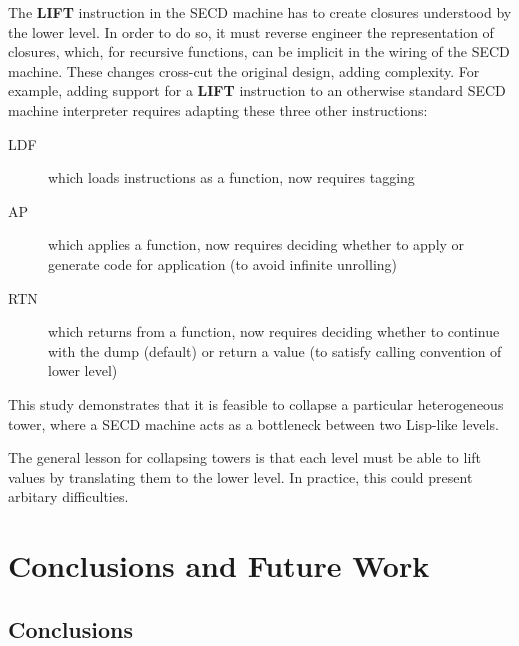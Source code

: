 \documentclass[sigplan,anonymous,review]{acmart}
\theoremstyle{definition}
\begin{document}
The \textbf{LIFT} instruction in the SECD machine has to create
closures understood by the lower level. In order to do so, it must
reverse engineer the representation of closures, which, for recursive
functions, can be implicit in the wiring of the SECD machine. These changes cross-cut the original design, adding complexity.
For example, adding support for a \textbf{LIFT} instruction to an otherwise standard SECD machine interpreter
requires adapting these three other instructions:
\begin{description}
\item [LDF] which loads instructions as a function, now requires tagging
\item [AP ] which applies a function, now requires deciding whether to apply or generate code for application (to avoid infinite unrolling)
\item [RTN] which returns from a function, now requires deciding whether to continue with the dump (default) or return a value (to satisfy calling convention of lower level)
\end{description}

This study demonstrates that it is feasible to collapse a particular
heterogeneous tower, where a SECD machine acts as a bottleneck between
two Lisp-like levels.

The general lesson for collapsing towers is that each level must be
able to lift values by translating them to the lower level. In
practice, this could present arbitary difficulties.

\section{Conclusions and Future Work}\label{sec:conc}

\subsection{Conclusions}
\end{document}
